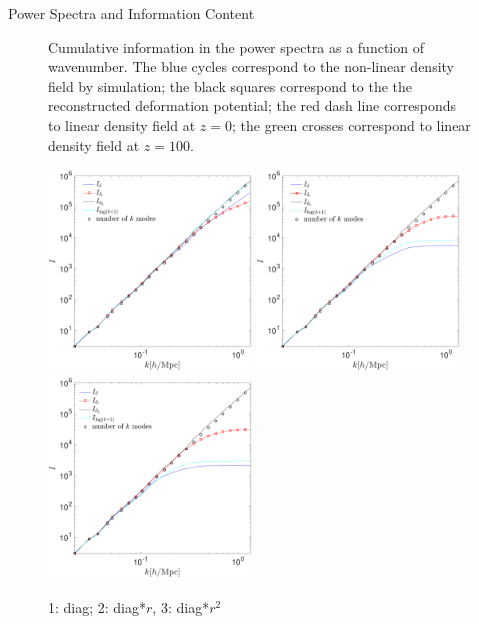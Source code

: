 \begin{section}{Power Spectra and Information Content}
\begin{figure}[t!]
\begin{center}
   \caption{Cumulative information in the power spectra as a function of wavenumber. The blue 
cycles correspond to the non-linear density field by simulation; the black squares correspond 
to the the reconstructed deformation potential; the red dash line corresponds to linear density 
field at $z=0$; the green crosses correspond to linear density field at $z=100$.}
  \label{fig:fisherinfo}
 \end{center}
\end{figure}
\begin{figure}
\centering
  \includegraphics[width=0.48\textwidth]{fisher_addlog_diag-crop.pdf}
  \includegraphics[width=0.48\textwidth]{fisher_addlog_diagr-crop.pdf}
  \includegraphics[width=0.48\textwidth]{fisher_addlog_diagr2-crop.pdf}
\caption{1: diag; 2: diag*$r$, 3: diag*$r^2$}
\end{figure}

\end{section}
